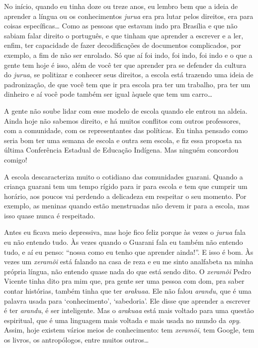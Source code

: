 No início, quando eu tinha doze ou treze anos, eu lembro bem que a ideia
de aprender a língua ou os conhecimentos \emph{jurua} era pra lutar pelos
direitos, era para coisas específicas\ldots{} Como as pessoas que estavam
indo pra Brasília e que não sabiam falar direito o português, e que
tinham que aprender a escrever e a ler, enfim, ter capacidade de fazer
decodificações de documentos complicados, por exemplo, a fim de não ser
enrolado. Só que aí foi indo, foi indo, foi indo e o que a gente tem
hoje é isso, além de você ter que aprender pra se defender da cultura
do \emph{jurua}, se politizar e conhecer seus direitos, a escola está trazendo
uma ideia de padronização, de que você tem que ir pra escola pra ter um
trabalho, pra ter um dinheiro e aí você pode também ser igual àquele
que tem um carro\ldots{}

A gente não soube lidar com esse modelo de escola quando ele entrou na
aldeia. Ainda hoje não sabemos direito, e há muitos conflitos com
outros professores, com a comunidade, com os representantes das
políticas. Eu tinha pensado como seria bom ter uma semana de escola e
outra sem escola, e fiz essa proposta na última Conferência Estadual de
Educação Indígena. Mas ninguém concordou comigo!

A escola descaracteriza muito o cotidiano das comunidades guarani.
Quando a criança guarani tem um tempo rígido para ir para escola e tem
que cumprir um horário, aos poucos vai perdendo a delicadeza em
respeitar o seu momento. Por exemplo, as meninas quando estão
menstruadas não devem ir para a escola, mas isso quase nunca é
respeitado.

Antes eu ficava meio depressiva, mas hoje fico feliz porque às vezes o
\emph{jurua} fala eu não entendo tudo. Às vezes quando o Guarani fala eu
também não entendo tudo, e aí eu penso: ``nossa como eu tenho que
aprender ainda!''. E isso é bom. Às vezes um \emph{xeramõi} está falando na
casa de reza e eu me sinto analfabeta na minha própria língua, não
entendo quase nada do que está sendo dito. O \emph{xeramõi} Pedro Vicente
tinha dito pra mim que, pra gente ser uma pessoa com dom, pra saber
contar histórias, também tinha que ter \emph{arakuaa}. Ele não falou \emph{arandu},
que é uma palavra usada para ‘conhecimento’, ‘sabedoria’. Ele disse que
aprender a escrever é ter \emph{arandu}, é ser inteligente. Mas o \emph{arakuaa} está
mais voltado para uma questão espiritual, que é uma linguagem mais
voltada e mais usada no mundo da \emph{opy}. Assim, hoje existem vários meios
de conhecimento: tem \emph{xeramõi}, tem Google, tem os livros, os
antropólogos, entre muitos outros\ldots{}

